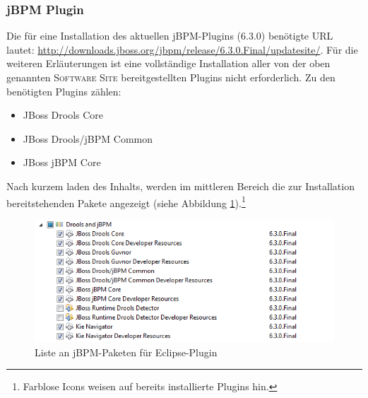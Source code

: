 \subsubsection{jBPM Plugin}
Die für eine Installation des aktuellen jBPM-Plugins (6.3.0) benötigte URL lautet: \url{http://downloads.jboss.org/jbpm/release/6.3.0.Final/updatesite/}. Für die weiteren Erläuterungen ist eine vollständige Installation aller von der oben genannten \textsc{Software Site} bereitgestellten Plugins nicht erforderlich. Zu den benötigten Plugins zählen:
\begin{itemize}\renewcommand{\labelitemi}{\itemizecheck}
	\item JBoss Drools Core
	\item JBoss Drools/jBPM Common
	\item JBoss jBPM Core
\end{itemize}
Nach kurzem laden des Inhalts, werden im mittleren Bereich die zur Installation bereitstehenden Pakete angezeigt (siehe Abbildung \ref{fig:install-jbpm-package-list}).\footnote{Farblose Icons weisen auf bereits installierte Plugins hin.}
\begin{figure}[htp]
	\centering
	\includegraphics[width=\textwidth]{image/screenshots/install-jbpm-plugin}
	\caption{Liste an jBPM-Paketen für Eclipse-Plugin}\label{fig:install-jbpm-package-list}
\end{figure}

